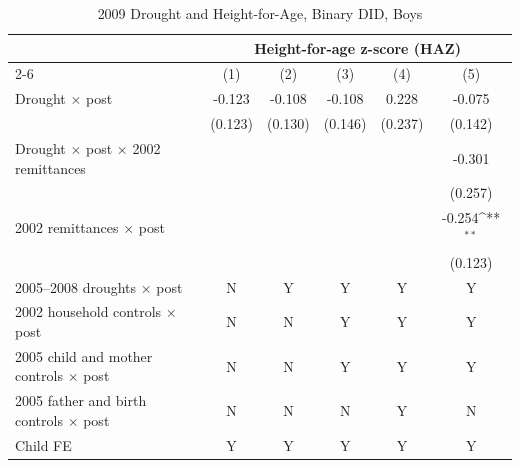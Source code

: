 \documentclass[12pt]{article}
\def\sym#1{\ifmmode^{#1}\else\(^{#1}\)\fi}
\begin{document}
\begingroup
\footnotesize
\renewcommand{\arraystretch}{0.86}
\setlength{\tabcolsep}{4pt}
\setlength{\LTcapwidth}{\textwidth}
\begin{longtable}{l*{5}{c}}
\caption{2009 Drought and Height-for-Age, Binary DID, Boys}\\
\toprule
 & \multicolumn{5}{c}{Height-for-age z-score (HAZ)}\\
\cmidrule(lr){2-6}
            &\multicolumn{1}{c}{(1)}         &\multicolumn{1}{c}{(2)}         &\multicolumn{1}{c}{(3)}         &\multicolumn{1}{c}{(4)}         &\multicolumn{1}{c}{(5)}         \\
\midrule
Drought \ensuremath{\times} post&      -0.123         &      -0.108         &      -0.108         &       0.228         &      -0.075         \\
            &     (0.123)         &     (0.130)         &     (0.146)         &     (0.237)         &     (0.142)         \\
Drought \ensuremath{\times} post \ensuremath{\times} 2002 remittances&                     &                     &                     &                     &      -0.301         \\
            &                     &                     &                     &                     &     (0.257)         \\
2002 remittances \ensuremath{\times} post&                     &                     &                     &                     &      -0.254\sym{**} \\
            &                     &                     &                     &                     &     (0.123)         \\
\midrule
2005--2008 droughts \ensuremath{\times} post&           N         &           Y         &           Y         &           Y         &           Y         \\
2002 household controls \ensuremath{\times} post&           N         &           N         &           Y         &           Y         &           Y         \\
2005 child and mother controls \ensuremath{\times} post&           N         &           N         &           Y         &           Y         &           Y         \\
2005 father and birth controls \ensuremath{\times} post&           N         &           N         &           N         &           Y         &           N         \\
Child FE    &           Y         &           Y         &           Y         &           Y         &           Y         \\

\end{longtable}
\end{document}
